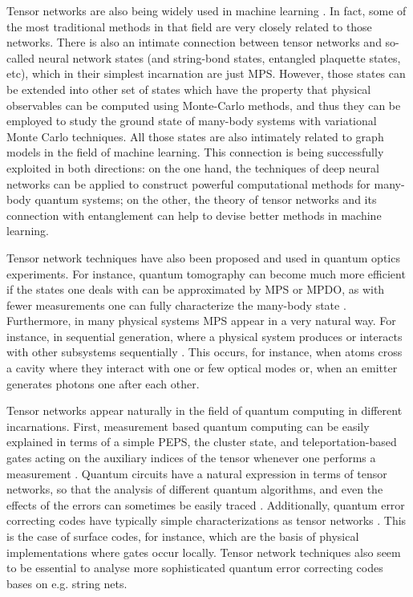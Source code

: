 \documentclass[rmp,aps,reprint,superscriptaddress,nobalancelastpage]{revtex4-1}
\begin{document}
Tensor networks are also being widely used in machine learning \cite{huggins2019towards,stoudenmire2016supervised,carleo2019machine,glasser2019expressive,glasser2018supervised}. In fact, some of the most traditional methods in that field are very closely related to those networks. There is also an intimate connection between tensor networks and so-called neural network states (and string-bond states, entangled plaquette states, etc), which in their simplest incarnation are just MPS. However, those states can be extended into other set of states which have the property that physical observables can be computed using Monte-Carlo methods, and thus they can be employed to study the ground state of many-body systems with variational Monte Carlo techniques. All those states are also intimately related to graph models in the field of machine learning. This connection is being successfully exploited in both directions: on the one hand, the techniques of deep neural networks can be applied to construct powerful computational methods for many-body quantum systems; on the other, the theory of tensor networks and its connection with entanglement can help to devise better methods in machine learning.

Tensor network techniques have also been proposed and used in quantum optics experiments. For instance, quantum tomography can become much more efficient if the states one deals with can be approximated by MPS or MPDO, as with fewer measurements one can fully characterize the many-body state \cite{cramer2010efficient}. Furthermore, in many physical systems MPS appear in a very natural way. For instance, in sequential generation, where a physical system produces or interacts with other subsystems sequentially \cite{schoen:hen-and-egg,osborne2010holographic}. This occurs, for instance, when atoms cross a cavity where they interact with one or few optical modes or, when an emitter generates photons one after each other.

Tensor networks appear naturally in the field of quantum computing in different incarnations. First, measurement based quantum computing can be easily explained in terms of a simple PEPS, the cluster state, and teleportation-based gates acting on the auxiliary indices of the tensor whenever one performs a measurement \cite{verstraete:mbc-peps}. Quantum circuits have a natural expression in terms of tensor networks, so that the analysis of different quantum algorithms, and even the effects of the errors can sometimes be easily traced \cite{nielsen-chuang}. Additionally, quantum error correcting codes have typically simple characterizations as tensor networks \cite{terhal2015quantum}. This is the case of surface codes, for instance, which are the basis of physical implementations where gates occur locally. Tensor network techniques also seem to be essential to analyse more sophisticated quantum error correcting codes bases on e.g. string nets.
\end{document}
